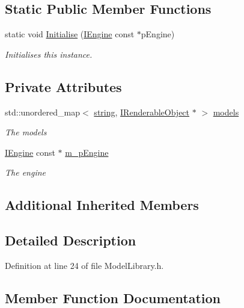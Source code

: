 \subsection*{Static Public Member Functions}
\begin{DoxyCompactItemize}
\item 
static void \hyperlink{class_model_library_a85d5aeaa54615a41c0f38f638606fe41}{Initialise} (\hyperlink{class_i_engine}{I\+Engine} const $\ast$p\+Engine)
\begin{DoxyCompactList}\small\item\em Initialises this instance. \end{DoxyCompactList}\end{DoxyCompactItemize}
\subsection*{Private Attributes}
\begin{DoxyCompactItemize}
\item 
std\+::unordered\+\_\+map$<$ \hyperlink{_types_8h_ad453f9f71ce1f9153fb748d6bb25e454}{string}, \hyperlink{class_i_renderable_object}{I\+Renderable\+Object} $\ast$ $>$ \hyperlink{class_model_library_a96a5beac0ac16cd79317772448e78487}{models}
\begin{DoxyCompactList}\small\item\em The models \end{DoxyCompactList}\item 
\hyperlink{class_i_engine}{I\+Engine} const $\ast$ \hyperlink{class_model_library_aa49436037315f3a3732bb3a0a855b243}{m\+\_\+p\+Engine}
\begin{DoxyCompactList}\small\item\em The engine \end{DoxyCompactList}\end{DoxyCompactItemize}
\subsection*{Additional Inherited Members}


\subsection{Detailed Description}


Definition at line 24 of file Model\+Library.\+h.



\subsection{Member Function Documentation}
